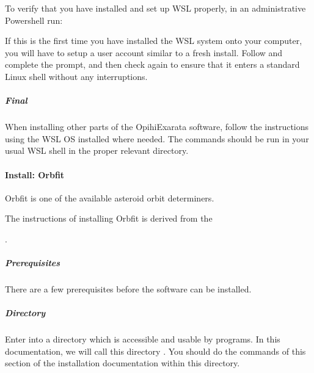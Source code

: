 \documentclass[letterpaper,11pt,english]{sphinxmanual}
\begin{document}
\sphinxAtStartPar
To verify that you have installed and set up WSL properly, in an administrative Powershell run:

\begin{sphinxVerbatim}[commandchars=\\\{\}]
\end{sphinxVerbatim}

\sphinxAtStartPar
If this is the first time you have installed the WSL system onto your computer,
you will have to setup a user account similar to a fresh install. Follow and
complete the prompt, and then check  again to ensure that it
enters a standard Linux shell without any interruptions.


\subparagraph{Final}
\label{\detokenize{technical/installation/windows:final}}
\sphinxAtStartPar
When installing other parts of the OpihiExarata software, follow the
instructions using the WSL OS installed where needed. The commands should be
run in your usual WSL shell in the proper relevant directory.

\sphinxstepscope


\paragraph{Install: Orbfit}
\label{\detokenize{technical/installation/orbfit:install-orbfit}}\label{\detokenize{technical/installation/orbfit:technical-installation-orbfit}}\label{\detokenize{technical/installation/orbfit::doc}}
\sphinxAtStartPar
Orbfit is one of the available asteroid orbit determiners.

\sphinxAtStartPar
The instructions of installing Orbfit is derived from the
%
\begin{footnote}[36]\sphinxAtStartFootnote
{}
%
\end{footnote}.


\subparagraph{Prerequisites}
\label{\detokenize{technical/installation/orbfit:prerequisites}}
\sphinxAtStartPar
There are a few prerequisites before the software can be installed.


\subparagraph{Directory}
\label{\detokenize{technical/installation/orbfit:directory}}
\sphinxAtStartPar
Enter into a directory which is accessible and usable by programs. In this
documentation, we will call this directory . You should do the
commands of this section of the installation documentation within this
directory.
\end{document}
